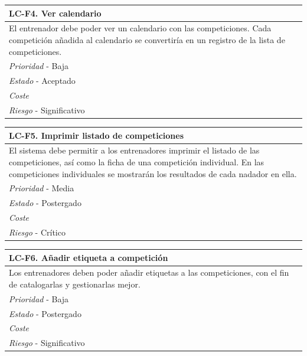 	\begin{center}
		\begin{tabularx}{15cm}{|X|}
			\hline 
				\bf{LC-F4. Ver calendario}\\
			\hline
				El entrenador debe poder ver un calendario con las competiciones. Cada competición añadida al calendario se convertiría en un registro de la lista de competiciones.\\
			\hline
				{\it Prioridad} - Baja\\
			\hline
				{\it Estado} - Aceptado\\
			\hline
				{\it Coste}\\
			\hline
				{\it Riesgo} - Significativo\\
			\hline
		\end{tabularx}
	\end{center}
	
	\begin{center}
		\begin{tabularx}{15cm}{|X|}
			\hline 
				\bf{LC-F5. Imprimir listado de competiciones}\\
			\hline
				El sistema debe permitir a los entrenadores imprimir el listado de las competiciones, así como la ficha de una competición individual. En las competiciones individuales se mostrarán los resultados de cada nadador en ella.\\
			\hline
				{\it Prioridad} - Media\\
			\hline
				{\it Estado} - Postergado\\
			\hline
				{\it Coste}\\
			\hline
				{\it Riesgo} - Crítico\\
			\hline
		\end{tabularx}
	\end{center}
	
	\begin{center}
		\begin{tabularx}{15cm}{|X|}
			\hline 
				\bf{LC-F6. Añadir etiqueta a competición}\\
			\hline
				Los entrenadores deben poder añadir etiquetas a las competiciones, con el fin de catalogarlas y gestionarlas mejor.\\
			\hline
				{\it Prioridad} - Baja\\
			\hline
				{\it Estado} - Postergado\\
			\hline
				{\it Coste}\\
			\hline
				{\it Riesgo} - Significativo\\
			\hline
		\end{tabularx}
	\end{center}
	

